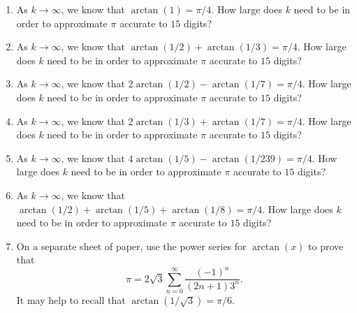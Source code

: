 \begin{enumerate}
    \item   As $k \rightarrow \infty$, we know that $\arctan(1) = \pi/4$.  How large does $k$ need to be in order to approximate $\pi$ accurate to $15$ digits?
    \item   As $k \rightarrow \infty$, we know that $\arctan(1/2) + \arctan(1/3) = \pi/4$.  How large does $k$ need to be in order to approximate $\pi$ accurate to $15$ digits?
    \item   As $k \rightarrow \infty$, we know that $2\arctan(1/2) - \arctan(1/7) = \pi/4$.  How large does $k$ need to be in order to approximate $\pi$ accurate to $15$ digits?
    \item   As $k \rightarrow \infty$, we know that $2\arctan(1/3) + \arctan(1/7) = \pi/4$.  How large does $k$ need to be in order to approximate $\pi$ accurate to $15$ digits?
    \item   As $k \rightarrow \infty$, we know that $4\arctan(1/5) - \arctan(1/239) = \pi/4$.  How large does $k$ need to be in order to approximate $\pi$ accurate to $15$ digits?
    \item   As $k \rightarrow \infty$, we know that $\arctan(1/2) + \arctan(1/5) + \arctan(1/8) = \pi/4$.  How large does $k$ need to be in order to approximate $\pi$ accurate to $15$ digits?
    \item   On a separate sheet of paper, use the power series for $\arctan(x)$ to prove that \\
    \[\pi = 2\sqrt{3} \displaystyle\sum_{n=0}^{\infty} \dfrac{(-1)^n}{(2n+1)3^n}.\]  It may help to recall that $\arctan(1/\sqrt{3}) = \pi/6$.
\end{enumerate}
